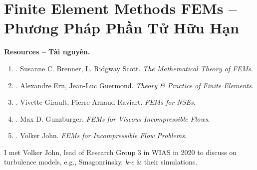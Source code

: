 \documentclass{article}
\begin{document}
\section{Finite Element Methods FEMs -- Phương Pháp Phần Tử Hữu Hạn}
\textbf{\textsf{Resources -- Tài nguyên.}}
\begin{enumerate}
	\item \cite{Brenner_Scott2008}. {\sc Susanne C. Brenner, L. Ridgway Scott}. {\it The Mathematical Theory of FEMs}.
	\item \cite{Ern_Guermond2004}. {\sc Alexandre Ern, Jean-Luc Guermond}. {\it Theory \& Practice of Finite Elements}.
	\item \cite{Girault_Raviart1986}. {\sc Vivette Girault, Pierre-Arnaud Raviart}. {\it FEMs for NSEs}.
	\item \cite{Gunzburger1989}. {\sc Max D. Gunzburger}. {\it FEMs for Viscous Incompressible Flows}.
	\item \cite{John2016}. {\sc Volker John}. {\it FEMs for Incompressible Flow Problems}.
\end{enumerate}
I met {\sc Volker John}, lead of Research Group 3 in WIAS in 2020 to discuss on turbulence models, e.g., Smagonrinsky, $k$-$\epsilon$ \& their simulations.

\end{document}
